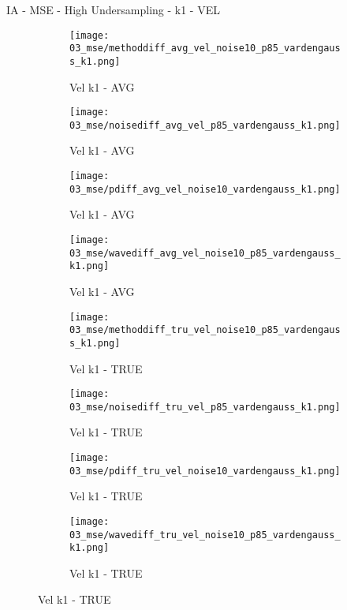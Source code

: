 \documentclass{beamer}
\begin{document}
\begin{frame}{IA - MSE - High Undersampling - k1 - VEL}{}
\begin{figure}
\begin{subfigure}{0.24\textwidth}
\texttt{[image: 03\_mse/methoddiff\_avg\_vel\_noise10\_p85\_vardengauss\_k1.png]}
\vspace{-20pt}
\caption*{\tiny Vel k1 - AVG}
\end{subfigure}
\begin{subfigure}{0.24\textwidth}
\texttt{[image: 03\_mse/noisediff\_avg\_vel\_p85\_vardengauss\_k1.png]}
\vspace{-20pt}
\caption*{\tiny Vel k1 - AVG}
\end{subfigure}
\begin{subfigure}{0.24\textwidth}
\texttt{[image: 03\_mse/pdiff\_avg\_vel\_noise10\_vardengauss\_k1.png]}
\vspace{-20pt}
\caption*{\tiny Vel k1 - AVG}
\end{subfigure}
\begin{subfigure}{0.24\textwidth}
\texttt{[image: 03\_mse/wavediff\_avg\_vel\_noise10\_p85\_vardengauss\_k1.png]}
\vspace{-20pt}
\caption*{\tiny Vel k1 - AVG}
\end{subfigure}

\begin{subfigure}{0.24\textwidth}
\texttt{[image: 03\_mse/methoddiff\_tru\_vel\_noise10\_p85\_vardengauss\_k1.png]}
\vspace{-20pt}
\caption*{\tiny Vel k1 - TRUE}
\end{subfigure}
\begin{subfigure}{0.24\textwidth}
\texttt{[image: 03\_mse/noisediff\_tru\_vel\_p85\_vardengauss\_k1.png]}
\vspace{-20pt}
\caption*{\tiny Vel k1 - TRUE}
\end{subfigure}
\begin{subfigure}{0.24\textwidth}
\texttt{[image: 03\_mse/pdiff\_tru\_vel\_noise10\_vardengauss\_k1.png]}
\vspace{-20pt}
\caption*{\tiny Vel k1 - TRUE}
\end{subfigure}
\begin{subfigure}{0.24\textwidth}
\texttt{[image: 03\_mse/wavediff\_tru\_vel\_noise10\_p85\_vardengauss\_k1.png]}
\vspace{-20pt}
\caption*{\tiny Vel k1 - TRUE}
\end{subfigure}
\end{figure}
\end{frame}
\end{document}
